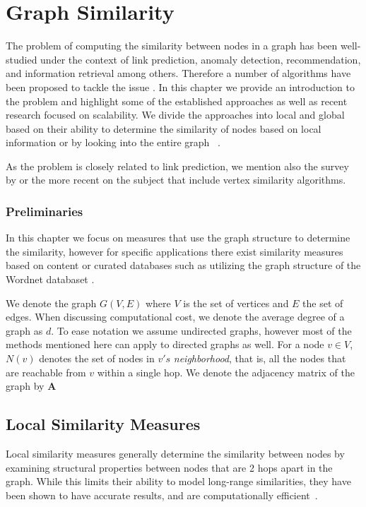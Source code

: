\chapter{Graph Similarity}
\label{ch:bg-graph-similarity}

The problem of computing the similarity between nodes in a graph has been
well-studied under the context of link prediction, anomaly detection,
recommendation, and information retrieval among others. Therefore a
number of algorithms have been proposed to tackle the issue .
In this chapter we provide an introduction to the problem and
highlight some of the established approaches as well as recent
research focused on scalability. We divide the approaches into local
and global based on their ability to determine the similarity of nodes
based on local information or by looking into the entire graph
~\cite{link-prediction-survey}.

As the problem is closely related to link prediction, we mention
also the survey by \citet{link-prediction-survey} or the more
recent \cite{link-prediction-survey-2017} on the subject
that include vertex similarity algorithms.

\subsection*{Preliminaries}

In this chapter we focus on
measures that use the graph structure to determine the similarity,
however for specific applications there exist similarity measures
based on content or curated databases such as utilizing the graph
structure of the Wordnet databaset \cite{wordnet-similarity, wordnet-relatedness, wordsim}.

We denote the graph $G(V, E)$ where $V$ is the set of vertices and $E$ the set
of edges. When discussing computational cost, we denote the average degree of a graph as $d$.
To ease notation we assume undirected graphs, however most of the methods
mentioned here can apply to directed graphs as well.
For a node $v \in V$, $N(v)$ denotes the set of nodes in $v's$ \emph{neighborhood},
that is, all the nodes that are reachable from $v$ within a single hop.
We denote the adjacency matrix of the graph by $\mathbf{A}$


\section{Local Similarity Measures}

Local similarity measures generally determine the similarity between
nodes by examining structural properties between nodes that
are 2 hops apart in the graph. While this limits their ability to model long-range
similarities, they have been shown to have accurate results, and are computationally
efficient~\cite{link-prediction-survey}.


